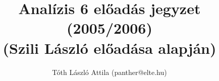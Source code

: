 \documentclass[fleqn,10pt,a4paper,titlepage]{article}
\title{Analízis 6 előadás jegyzet (2005/2006)\\(Szili László előadása alapján)}
\author{Tóth László Attila (panther@elte.hu)}
\date{}
\begin{document}
  \maketitle
  \mktoc
  
%  
%  
\end{document}
